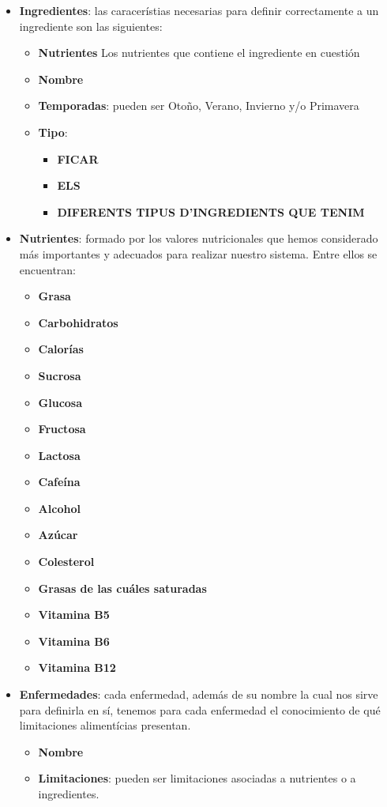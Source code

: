 \documentclass[12]{article}
\begin{document}
\begin{itemize}
	\item \textbf{Ingredientes}: las caracerístias necesarias para definir correctamente a un ingrediente son las siguientes: \begin{itemize}
		\item \textbf{Nutrientes} Los nutrientes que contiene el ingrediente en cuestión
		\item \textbf{Nombre}
		\item \textbf{Temporadas}: pueden ser Otoño, Verano, Invierno y/o Primavera
		\item \textbf{Tipo}: \begin{itemize}
			\item \textbf{FICAR}
			\item \textbf{ELS}
			\item \textbf{DIFERENTS TIPUS D'INGREDIENTS QUE TENIM}
			\end{itemize}
		\end{itemize}
	\item \textbf{Nutrientes}: formado por los valores nutricionales que hemos considerado más importantes y adecuados para realizar nuestro sistema. Entre ellos se encuentran: 
	\begin{itemize} 
		\item \textbf{Grasa}
		\item \textbf{Carbohidratos}
		\item \textbf{Calorías}
		\item \textbf{Sucrosa}
		\item \textbf{Glucosa}
		\item \textbf{Fructosa}
		\item \textbf{Lactosa}
		\item \textbf{Cafeína}
		\item \textbf{Alcohol}
		\item \textbf{Azúcar}
		\item \textbf{Colesterol}
		\item \textbf{Grasas de las cuáles saturadas}
		\item \textbf{Vitamina B5}
		\item \textbf{Vitamina B6}
		\item \textbf{Vitamina B12}
	\end{itemize}


\item \textbf{Enfermedades}: cada enfermedad, además de su nombre la cual nos sirve para definirla en sí, tenemos para cada enfermedad el conocimiento de qué limitaciones alimentícias presentan. \begin{itemize}
	\item \textbf{Nombre}
	\item \textbf{Limitaciones}: pueden ser limitaciones asociadas a nutrientes o a ingredientes.
\end{itemize}




\end{itemize}
\end{document}
